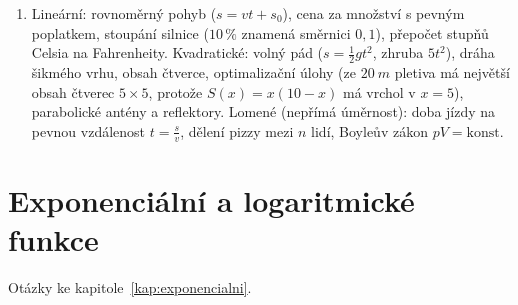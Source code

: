 \begin{enumerate}[label=\textbf{\arabic*.}, leftmargin=*, itemsep=0.8em]
  \item {}
  Lineární: rovnoměrný pohyb ($s = vt + s_0$), cena za množství s pevným poplatkem, stoupání silnice ($10\,\%$ znamená směrnici $0{,}1$), přepočet stupňů Celsia na Fahrenheity. Kvadratické: volný pád ($s = \frac{1}{2}gt^2$, zhruba $5t^2$), dráha šikmého vrhu, obsah čtverce, optimalizační úlohy (ze $20\ \si{m}$ pletiva má největší obsah čtverec $5\times 5$, protože $S(x) = x(10 - x)$ má vrchol v $x = 5$), parabolické antény a reflektory. Lomené (nepřímá úměrnost): doba jízdy na pevnou vzdálenost $t = \frac{s}{v}$, dělení pizzy mezi $n$ lidí, Boyleův zákon $pV = \text{konst.}$ 
\end{enumerate}

\section{Exponenciální a logaritmické funkce}

Otázky ke kapitole~\ref{kap:exponencialni}.

